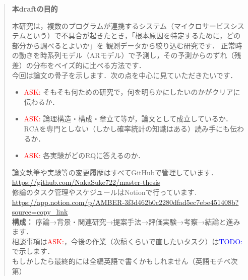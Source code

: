 \begin{abstract}
    \textbf{本draftの目的}\par\smallskip
    本研究は，複数のプログラムが連携するシステム（マイクロサービスシステムという）で不具合が起きたとき，「根本原因を特定するために，どの部分から調べるとよいか」を
    観測データから絞り込む研究です．
    正常時の動きを時系列モデル（ARモデル）で予測し，その予測からのずれ（残差）の分布をベイズ的に比べる方法です．\\
    今回は論文の骨子を示します．次の点を中心に見ていただきたいです．
    \begin{itemize}
        \item \textcolor{red}{ASK:} そもそも何ための研究で，何を明らかにしたいのかがクリアに伝わるか．
        \item \textcolor{red}{ASK:} 論理構造・構成・章立て等が，論文として成立しているか．RCAを専門としない（しかし確率統計の知識はある）読み手にも伝わるか．
        \item \textcolor{red}{ASK:} 各実験がどのRQに答えるのか．
    \end{itemize}
    論文執筆や実験等の変更履歴はすべてGitHubで管理しています．\\
    \href{https://github.com/NakaSuke722/master-thesis}{https://github.com/NakaSuke722/master-thesis} \\
    修論のタスク管理やスケジュールはNotionで行っています. \\
    \href{https://app.notion.com/p/AMBER-3f3d462b0c2280dfad5ec7ebe451408b?source=copy_link}{https://app.notion.com/p/AMBER-3f3d462b0c2280dfad5ec7ebe451408b?source=copy\_link} \\

    \medskip
    \noindent\textbf{構成：} 序論→背景・関連研究→提案手法→評価実験→考察→結論と進みます．\\
    \underline{相談事項は\textcolor{red}{ASK:}，今後の作業（次稿くらいで直したいタスク）は\textcolor{blue}{TODO:}}で示します．\\
    もしかしたら最終的には全編英語で書くかもしれません（英語モチベ次第）\\
\end{abstract}

